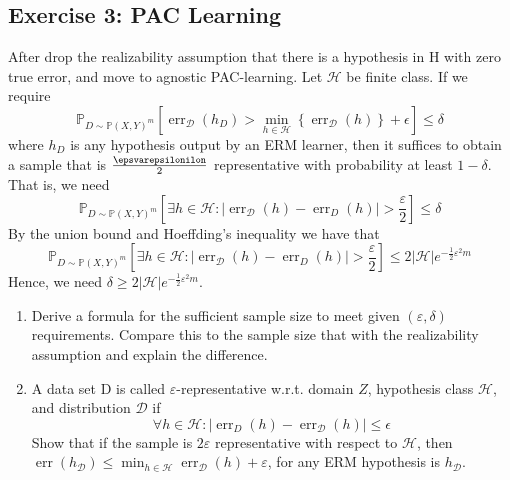\subsection{Exercise 3:  PAC Learning}
After drop the realizability assumption that there is a hypothesis in H with zero true error, and move to agnostic PAC-learning. Let $\mathcal{H}$ be finite class. If we require
$$
\mathbb{P}_{D \sim \mathbb{P}(X, Y)^{m}}\left[\operatorname{err}_{\mathcal{D}}\left(h_{D}\right)>\min _{h \in \mathcal{H}}\left\{\operatorname{err}_{\mathcal{D}}(h)\right\}+\epsilon\right] \leq \delta
$$
where $h_{D}$ is any hypothesis output by an ERM learner, then it suffices to obtain a sample that is $\frac{\epsvarepsilonilon}{2}$ representative with probability at least $1-\delta .$ That is, we need
$$
\mathbb{P}_{D \sim \mathbb{P}(X, Y)^{m}}\left[\exists h \in \mathcal{H}:\left|\operatorname{err}_{\mathcal{D}}(h)-\operatorname{err}_{D}(h)\right|>\frac{\varepsilon}{2}\right] \leq \delta
$$
By the union bound and Hoeffding's inequality we have that
$$
\mathbb{P}_{D \sim \mathbb{P}(X, Y)^{m}}\left[\exists h \in \mathcal{H}:\left|\operatorname{err}_{\mathcal{D}}(h)-\operatorname{err}_{D}(h)\right|>\frac{\varepsilon}{2}\right] \leq 2|\mathcal{H}| e^{-\frac{1}{2} \varepsilon^{2} m}
$$
Hence, we need $\delta \geq 2|\mathcal{H}| e^{-\frac{1}{2} \varepsilon^{2} m}$. 

\begin{enumerate}
    \item Derive a formula for the sufficient sample size to meet given $(\varepsilon,\delta)$ requirements. Compare this to the sample size that with the realizability assumption and explain the difference.
    \item A data set D is called $\varepsilon$-representative w.r.t. domain $Z$, hypothesis class $\mathcal{H}$,  and distribution  $\mathcal{D}$ if 
    \begin{equation*}
        \forall h \in \mathcal{H}:\left|\operatorname{err}_{D}(h)-\operatorname{err}_{\mathcal{D}}(h)\right| \leq \epsilon
    \end{equation*}\cite{Siebes}
     Show that if the sample is $2\varepsilon$ representative with respect to $\mathcal{H}$, then $\operatorname{err}(h_{\mathcal{D}}) \leq \operatorname{min}_{h \in \mathcal{H}}{\operatorname{err}_{\mathcal{D}}(h)} + \varepsilon$, for any ERM hypothesis is $h_{\mathcal{D}}$.

\end{enumerate}


